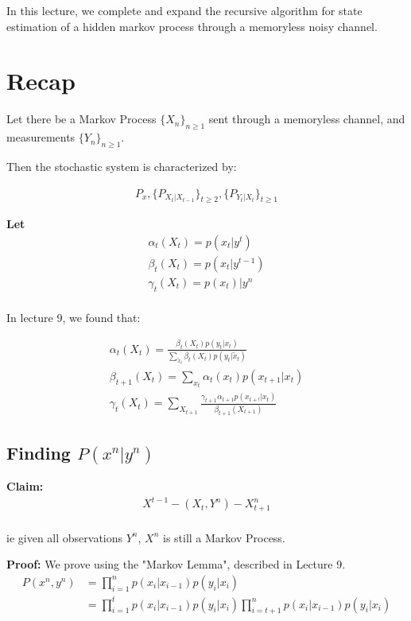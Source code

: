 \documentclass{article}
\begin{document}
In this lecture, we complete and expand the recursive algorithm for state estimation of a hidden markov process through a memoryless noisy channel. 




\section{Recap}

Let there be a Markov Process $\{X_n\}_{n \geq 1}$ sent through a memoryless channel, and measurements $\{Y_n\}_{n \geq 1}$.

Then the stochastic system is characterized by:

\begin{eqnarray*}
P_x, \{P_{X_t | X_{t-1}}\}_{t \geq 2}, \{P_{Y_t | X_t}\}_{t \geq 1}
\end{eqnarray*}

\textbf{Let}
\begin{eqnarray*}
\alpha_t(X_t) = p(x_t | y^t)\\
\beta_t(X_t) = p(x_t | y^{t-1})\\
\gamma_t(X_t) = p(x_t) | y^n\\
\end{eqnarray*}

In lecture 9, we found that:

\begin{eqnarray}
\alpha_t(X_t) = \frac{\beta_t(X_t)p(y_t | x_t)}{\sum_{\tilde{x}_t}^{}\beta_t(X_t)p(y_t | \tilde{x}_t)}\\
\beta_{t+1}(X_t) = \sum_{x_t}^{}\alpha_t(x_t)p(x_{t+1} | x_t)\\
\gamma_t(X_t) = \sum_{X_{t+1}}^{}\frac{\gamma_{t+1}\alpha_{t+1}p(x_{t+!} | x_t)}{\beta_{t+1}(X_{t+1})}
\end{eqnarray}

\subsection{Finding $ P(x^n | y^n) $}
\textbf{Claim:} 
\begin{eqnarray*}
X^{t-1} - (X_t, Y^n) - X^{n}_{t+1}\\
\end{eqnarray*}

ie given all observations $Y^n$, $X^n$ is still a Markov Process.

\textbf{Proof:}  We prove using the "Markov Lemma", described in Lecture 9.
\begin{align*}
P(x^n,y^n) &= \prod_{i=1}^{n}p(x_i | x_{i-1})p(y_i | x_i)\\
&= \prod_{i=1}^{t}p(x_i | x_{i-1})p(y_i | x_i) \prod_{i = t+1}^{n}p(x_i | x_{i-1})p(y_i | x_i)\\
\end{align*}
\end{document}
